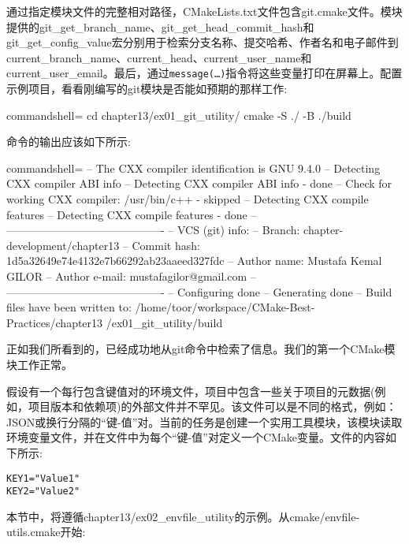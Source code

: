 通过指定模块文件的完整相对路径，CMakeLists.txt文件包含git.cmake文件。模块提供的git\_get\_branch\_name、git\_get\_head\_commit\_hash和git\_get\_config\_value宏分别用于检索分支名称、提交哈希、作者名和电子邮件到current\_branch\_name、current\_head、current\_user\_name和current\_user\_email。最后，通过\texttt{message(…)}指令将这些变量打印在屏幕上。配置示例项目，看看刚编写的git模块是否能如预期的那样工作:

\begin{tcblisting}{commandshell={}}
cd chapter13/ex01_git_utility/
cmake -S ./ -B ./build
\end{tcblisting}

命令的输出应该如下所示:

\begin{tcblisting}{commandshell={}}
-- The CXX compiler identification is GNU 9.4.0
-- Detecting CXX compiler ABI info
-- Detecting CXX compiler ABI info - done
-- Check for working CXX compiler: /usr/bin/c++ - skipped
-- Detecting CXX compile features
-- Detecting CXX compile features - done
-- -------------------------------------------
-- VCS (git) info:
-- Branch: chapter-development/chapter13
-- Commit hash: 1d5a32649e74e4132e7b66292ab23aaeed327fdc
-- Author name: Mustafa Kemal GILOR
-- Author e-mail: mustafagilor@gmail.com
-- -------------------------------------------
-- Configuring done
-- Generating done
-- Build files have been written to:
/home/toor/workspace/CMake-Best-Practices/chapter13
/ex01_git_utility/build
\end{tcblisting}

正如我们所看到的，已经成功地从git命令中检索了信息。我们的第一个CMake模块工作正常。


假设有一个每行包含键值对的环境文件，项目中包含一些关于项目的元数据(例如，项目版本和依赖项)的外部文件并不罕见。该文件可以是不同的格式，例如：JSON或换行分隔的“键-值”对。当前的任务是创建一个实用工具模块，该模块读取环境变量文件，并在文件中为每个“键-值”对定义一个CMake变量。文件的内容如下所示:

\begin{lstlisting}[style=styleCMake]
KEY1="Value1"
KEY2="Value2"
\end{lstlisting}

本节中，将遵循chapter13/ex02\_envfile\_utility的示例。从cmake/envfile-utils.cmake开始:

